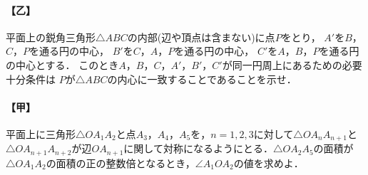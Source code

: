 \documentclass[../../main.tex]{subfiles}
\begin{document}
\paragraph{【乙】}
平面上の鋭角三角形$\triangle ABC$の内部(辺や頂点は含まない)に点$P$をとり，
$A'$を$B$，$C$，$P$を通る円の中心，
$B'$を$C$，$A$，$P$を通る円の中心，
$C'$を$A$，$B$，$P$を通る円の中心とする．
このとき$A$，$B$，$C$，$A'$，$B'$，$C'$が同一円周上にあるための必要十分条件は
$P$が$\triangle ABC$の内心に一致することであることを示せ．

\paragraph{【甲】}
平面上に三角形$\triangle OA_1A_2$と点$A_3$，$A_4$，$A_5$を，$n=1,2,3$に対して$\triangle OA_nA_{n+1}$と$\triangle OA_{n+1}A_{n+2}$が辺$OA_{n+1}$に関して対称になるようにとる．$\triangle OA_2A_5$の面積が$\triangle OA_1A_2$の面積の正の整数倍となるとき，$\angle A_1OA_2$の値を求めよ．
\end{document}
